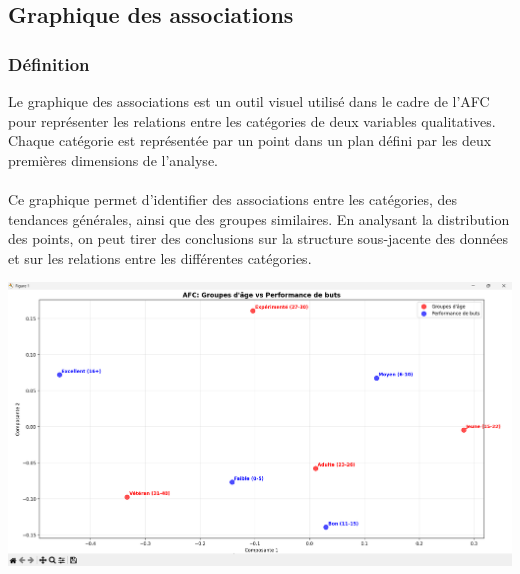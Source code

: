 \documentclass[12pt]{scrartcl}
\begin{document}

        \subsection{Graphique des associations}
            \subsubsection{Définition}
                Le graphique des associations est un outil visuel utilisé dans le cadre de l'AFC pour représenter les relations entre les catégories de deux variables qualitatives. Chaque catégorie est représentée par un point dans un plan défini par les deux premières dimensions de l'analyse.\\\\
                Ce graphique permet d'identifier des associations entre les catégories, des tendances générales, ainsi que des groupes similaires. En analysant la distribution des points, on peut tirer des conclusions sur la structure sous-jacente des données et sur les relations entre les différentes catégories.\\

                \begin{center}
                    \includegraphics[width=1\textwidth]{images/graphique_AFC_buts.png}
                \end{center}
\end{document}
